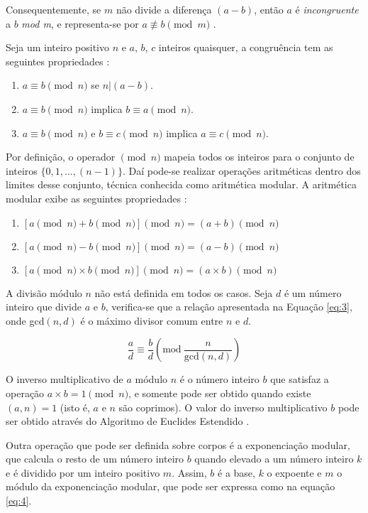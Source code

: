 Consequentemente, se \(m\) não divide a diferença $(a - b)$, então \(a\) é \textit{incongruente} a \(b\) \textit{mod m}, e representa-se por $a \not\equiv b \pmod m$ \cite{Santos:2014}.

Seja um inteiro positivo \(n\) e \(a\), \(b\), \(c\) inteiros quaisquer, a congruência tem as seguintes propriedades \cite{Stallings:2011}:
\begin{enumerate}
  \item $a \equiv b \pmod n$ se $n|(a - b)$.
  \item $a \equiv b \pmod n$ implica $b \equiv a \pmod n$.
  \item $a \equiv b \pmod n$ e $b \equiv c \pmod n$ implica $a \equiv c \pmod n$.
\end{enumerate}

Por definição, o operador $\pmod n$ mapeia todos os inteiros para o conjunto de inteiros $\{0, 1, ..., (n-1)\}$. Daí pode-se realizar operações aritméticas dentro dos limites desse conjunto, técnica conhecida como aritmética modular. A aritmética modular exibe as seguintes propriedades \cite{Stallings:2011}:
\begin{enumerate}
  \item $[a \pmod n + b \pmod n] \pmod n = (a + b) \pmod n$
  \item $[a \pmod n - b \pmod n] \pmod n = (a - b) \pmod n$
  \item $[a \pmod n \times b \pmod n] \pmod n = (a \times b) \pmod n$
\end{enumerate}

A divisão módulo $n$ não está definida em todos os casos. Seja \(d\) é um número inteiro que divide \(a\) e \(b\), verifica-se que a relação apresentada na Equação \ref{eq:3}, onde gcd\((n, d)\) é o máximo divisor comum entre \(n\) e \(d\).

\begin{equation}
  \frac{a}{d} \equiv \frac{b}{d}\left(\mbox{mod}\ \frac{n}{\text{gcd}(n,d)}\right) \label{eq:3}
\end{equation}

O inverso multiplicativo de $a$ módulo \(n\) é o número inteiro \(b\) que satisfaz a operação \(a \times b = 1 \pmod  n\), e somente pode ser obtido quando existe \((a, n) = 1\) (isto é, \(a\) e \(n\) são coprimos). O valor do inverso multiplicativo \(b\) pode ser obtido através do Algoritmo de Euclides Estendido \cite{Halim:2013}.

\par Outra operação que pode ser definida sobre corpos é a exponenciação modular, que calcula o resto de um número inteiro \(b\) quando elevado a um número inteiro \(k\) e é dividido por um inteiro positivo \(m\). Assim, $b$ é a base, $k$ o expoente e $m$ o módulo da exponenciação modular, que pode ser expressa como na equação \ref{eq:4}.

